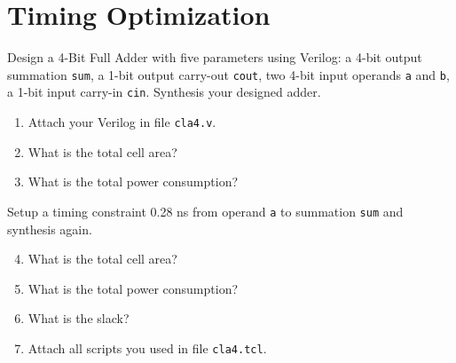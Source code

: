 \documentclass[acmlarge,screen=true,anonymous=false,11pt]{acmart}
\begin{document}
\section{Timing Optimization}
Design a 4-Bit Full Adder with five parameters using Verilog: a 4-bit output summation \texttt{sum}, a 1-bit output carry-out \texttt{cout}, two 4-bit input operands \texttt{a} and \texttt{b}, a 1-bit input carry-in \texttt{cin}. Synthesis your designed adder.
\begin{enumerate}
    \item Attach your Verilog in file \texttt{cla4.v}.
    \item What is the total cell area?
    \item What is the total power consumption?
\end{enumerate}
Setup a timing constraint 0.28 ns from operand \texttt{a} to summation \texttt{sum} and synthesis again.

\begin{enumerate}
    \setcounter{enumi}{3}
    \item What is the total cell area?
    \item What is the total power consumption?
    \item What is the slack?
    \item Attach all scripts you used in file \texttt{cla4.tcl}.
\end{enumerate}
\end{document}
